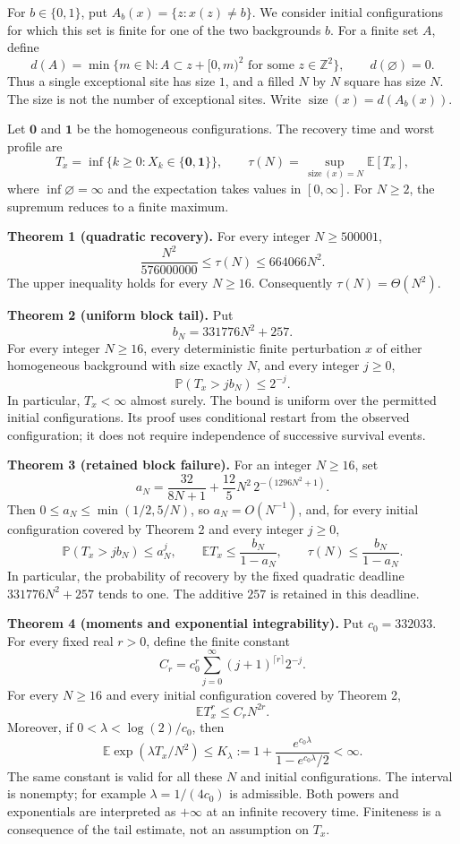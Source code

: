 \documentclass[
  11pt,
  a4paper,
]{article}
\begin{document}
For \(b\in\{0,1\}\), put \(A_b(x)=\{z:x(z)\ne b\}\). We consider initial
configurations for which this set is finite for one of the two
backgrounds \(b\). For a finite set \(A\), define \[
d(A)=\min\{m\in\mathbb N:A\subset z+[0,m)^2
\text{ for some }z\in\mathbb Z^2\},
\qquad d(\varnothing)=0.
\tag{2}
\] Thus a single exceptional site has size \(1\), and a filled \(N\) by
\(N\) square has size \(N\). The size is not the number of exceptional
sites. Write \(\operatorname{size}(x)=d(A_b(x))\).

Let \(\mathbf0\) and \(\mathbf1\) be the homogeneous configurations. The
recovery time and worst profile are \[
T_x=\inf\{k\geq0:X_k\in\{\mathbf0,\mathbf1\}\},
\qquad
\tau(N)=\sup_{\operatorname{size}(x)=N}\mathbb E[T_x],
\tag{3}
\] where \(\inf\varnothing=\infty\) and the expectation takes values in
\([0,\infty]\). For \(N\geq2\), the supremum reduces to a finite
maximum.

\textbf{Theorem 1 (quadratic recovery).} For every integer
\(N\geq500001\), \[
\frac{N^2}{576000000}\leq\tau(N)\leq664066N^2.
\tag{4}
\] The upper inequality holds for every \(N\geq16\). Consequently
\(\tau(N)=\Theta(N^2)\).

\textbf{Theorem 2 (uniform block tail).} Put \[
b_N=331776N^2+257.
\] For every integer \(N\geq16\), every deterministic finite
perturbation \(x\) of either homogeneous background with size exactly
\(N\), and every integer \(j\geq0\), \[
\mathbb P(T_x>jb_N)\leq2^{-j}.
\tag{4a}
\] In particular, \(T_x<\infty\) almost surely. The bound is uniform
over the permitted initial configurations. Its proof uses conditional
restart from the observed configuration; it does not require
independence of successive survival events.

\textbf{Theorem 3 (retained block failure).} For an integer \(N\geq16\),
set \[
a_N=\frac{32}{8N+1}+\frac{12}{5}N^2\,2^{-(1296N^2+1)}.
\tag{4b}
\] Then \(0\leq a_N\leq\min(1/2,5/N)\), so \(a_N=O(N^{-1})\), and, for
every initial configuration covered by Theorem 2 and every integer
\(j\geq0\), \[
\mathbb P(T_x>jb_N)\leq a_N^j,\qquad
\mathbb E T_x\leq\frac{b_N}{1-a_N},\qquad
\tau(N)\leq\frac{b_N}{1-a_N}.
\tag{4c}
\] In particular, the probability of recovery by the fixed quadratic
deadline \(331776N^2+257\) tends to one. The additive \(257\) is
retained in this deadline.

\textbf{Theorem 4 (moments and exponential integrability).} Put
\(c_0=332033\). For every fixed real \(r>0\), define the finite constant
\[
C_r=c_0^r\sum_{j=0}^{\infty}(j+1)^{\lceil r\rceil}2^{-j}.
\] For every \(N\geq16\) and every initial configuration covered by
Theorem 2, \[
\mathbb E T_x^r\leq C_r N^{2r}.
\tag{4d}
\] Moreover, if \(0<\lambda<\log(2)/c_0\), then \[
\mathbb E\exp(\lambda T_x/N^2)
\leq K_\lambda
:=1+\frac{e^{c_0\lambda}}{1-e^{c_0\lambda}/2}<\infty.
\tag{4e}
\] The same constant is valid for all these \(N\) and initial
configurations. The interval is nonempty; for example
\(\lambda=1/(4c_0)\) is admissible. Both powers and exponentials are
interpreted as \(+\infty\) at an infinite recovery time. Finiteness is a
consequence of the tail estimate, not an assumption on \(T_x\).
\end{document}
